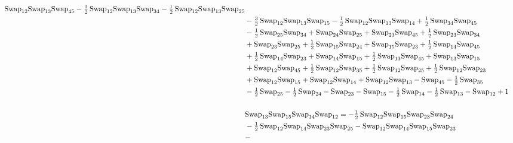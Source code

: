 \documentclass[12pt,dvipsnames,accepted=2016-08-18,a4paper,onecolumn]{quantumarticle}
\numberwithin{equation}{section}
\theoremstyle{definition}
\begin{document}
\begin{align*}
        \textnormal{Swap}_{12} \textnormal{Swap}_{13} \textnormal{Swap}_{45} - \tfrac12\,\textnormal{Swap}_{12} \textnormal{Swap}_{13} \textnormal{Swap}_{34} - \tfrac12\,\textnormal{Swap}_{12} \textnormal{Swap}_{13} \textnormal{Swap}_{25}\\ & - \tfrac32\,\textnormal{Swap}_{12} \textnormal{Swap}_{13} \textnormal{Swap}_{15} -
        \tfrac12\,\textnormal{Swap}_{12} \textnormal{Swap}_{13} \textnormal{Swap}_{14} + \tfrac12\,\textnormal{Swap}_{34} \textnormal{Swap}_{45}\\ & - \tfrac12\,\textnormal{Swap}_{25} \textnormal{Swap}_{34} + \textnormal{Swap}_{24} \textnormal{Swap}_{25} + \textnormal{Swap}_{23} \textnormal{Swap}_{45} +
        \tfrac12\,\textnormal{Swap}_{23} \textnormal{Swap}_{34}\\ & + \textnormal{Swap}_{23} \textnormal{Swap}_{25} + \tfrac12\,\textnormal{Swap}_{15} \textnormal{Swap}_{24} + \textnormal{Swap}_{15} \textnormal{Swap}_{23} + \tfrac12\,\textnormal{Swap}_{14} \textnormal{Swap}_{45}\\ & +
        \tfrac12\,\textnormal{Swap}_{14} \textnormal{Swap}_{23} + \textnormal{Swap}_{14} \textnormal{Swap}_{15} + \tfrac12\,\textnormal{Swap}_{13} \textnormal{Swap}_{45} + \textnormal{Swap}_{13} \textnormal{Swap}_{15}\\ & + \textnormal{Swap}_{12} \textnormal{Swap}_{45} + \tfrac12\,\textnormal{Swap}_{12} \textnormal{Swap}_{35} +
        \tfrac12\,\textnormal{Swap}_{12} \textnormal{Swap}_{25} + \tfrac12\,\textnormal{Swap}_{12} \textnormal{Swap}_{23}\\ & + \textnormal{Swap}_{12} \textnormal{Swap}_{15} + \textnormal{Swap}_{12} \textnormal{Swap}_{14} + \textnormal{Swap}_{12} \textnormal{Swap}_{13} - \textnormal{Swap}_{45} - \tfrac12\,\textnormal{Swap}_{35}\\ &
        - \tfrac12\,\textnormal{Swap}_{25} - \tfrac12\,\textnormal{Swap}_{24} - \textnormal{Swap}_{23} - \textnormal{Swap}_{15} - \tfrac12\,\textnormal{Swap}_{14} - \tfrac12\,\textnormal{Swap}_{13} - \textnormal{Swap}_{12} + 1\\
        \\
&\textnormal{Swap}_{13}   \textnormal{Swap}_{15}   \textnormal{Swap}_{14}   \textnormal{Swap}_{12} = -\tfrac12\,\textnormal{Swap}_{12} \textnormal{Swap}_{15} \textnormal{Swap}_{23} \textnormal{Swap}_{24} \\ & - \tfrac12\,\textnormal{Swap}_{12} \textnormal{Swap}_{14} \textnormal{Swap}_{23} \textnormal{Swap}_{25} - \textnormal{Swap}_{12} \textnormal{Swap}_{14} \textnormal{Swap}_{15} \textnormal{Swap}_{23}\\ & -

\end{align*}
\end{document}
